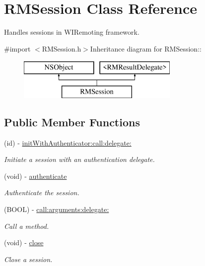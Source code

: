 \hypertarget{interface_r_m_session}{
\section{RMSession Class Reference}
\label{interface_r_m_session}
}


Handles sessions in WIRemoting framework.  


{\ttfamily \#import $<$RMSession.h$>$}Inheritance diagram for RMSession::\begin{figure}[H]
\begin{center}
\leavevmode
\includegraphics[height=2cm]{interface_r_m_session}
\end{center}
\end{figure}
\subsection*{Public Member Functions}
\begin{DoxyCompactItemize}
\item 
(id) -\/ \hyperlink{interface_r_m_session_ac0cd1eaf70a3afee073b376773d915ff}{initWithAuthenticator:call:delegate:}
\begin{DoxyCompactList}\small\item\em Initiate a session with an authentication delegate. \item\end{DoxyCompactList}\item 
\hypertarget{interface_r_m_session_aba47598cf422661784044b0f24286939}{
(void) -\/ \hyperlink{interface_r_m_session_aba47598cf422661784044b0f24286939}{authenticate}}
\label{interface_r_m_session_aba47598cf422661784044b0f24286939}

\begin{DoxyCompactList}\small\item\em Authenticate the session. \item\end{DoxyCompactList}\item 
(BOOL) -\/ \hyperlink{interface_r_m_session_a898ba9b048b6568b051acde8d2f48749}{call:arguments:delegate:}
\begin{DoxyCompactList}\small\item\em Call a method. \item\end{DoxyCompactList}\item 
\hypertarget{interface_r_m_session_a77c806e25987046026c7bb60accabe1b}{
(void) -\/ \hyperlink{interface_r_m_session_a77c806e25987046026c7bb60accabe1b}{close}}
\label{interface_r_m_session_a77c806e25987046026c7bb60accabe1b}

\begin{DoxyCompactList}\small\item\em Close a session. \item\end{DoxyCompactList}\end{DoxyCompactItemize}
